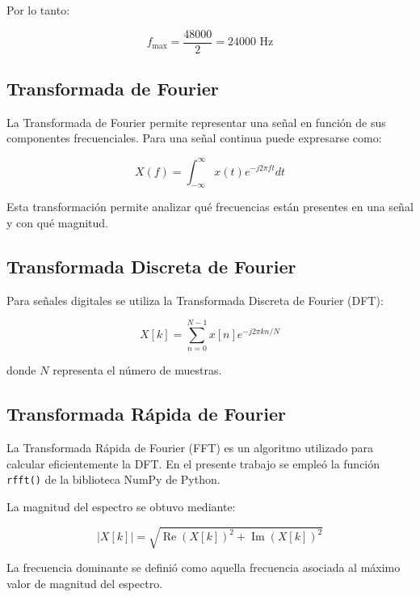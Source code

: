 \documentclass[conference]{IEEEtran}
\begin{document}
Por lo tanto:

\begin{equation}
f_{\max} = \frac{48000}{2} = 24000\text{ Hz}
\end{equation}


\subsection{Transformada de Fourier}

La Transformada de Fourier permite representar una señal en función de sus componentes frecuenciales. Para una señal continua puede expresarse como:

\begin{equation}
X(f) =
\int_{-\infty}^{\infty}
x(t)e^{-j2\pi ft}dt
\end{equation}

Esta transformación permite analizar qué frecuencias están presentes en una señal y con qué magnitud.


\subsection{Transformada Discreta de Fourier}

Para señales digitales se utiliza la Transformada Discreta de Fourier (DFT):

\begin{equation}
X[k] =
\sum_{n=0}^{N-1}
x[n]e^{-j2\pi kn/N}
\end{equation}

donde $N$ representa el número de muestras.


\subsection{Transformada Rápida de Fourier}

La Transformada Rápida de Fourier (FFT) es un algoritmo utilizado para calcular eficientemente la DFT. En el presente trabajo se empleó la función \texttt{rfft()} de la biblioteca NumPy de Python.

La magnitud del espectro se obtuvo mediante:

\begin{equation}
|X[k]| =
\sqrt{
\operatorname{Re}(X[k])^2+
\operatorname{Im}(X[k])^2
}
\end{equation}

La frecuencia dominante se definió como aquella frecuencia asociada al máximo valor de magnitud del espectro.
\end{document}
